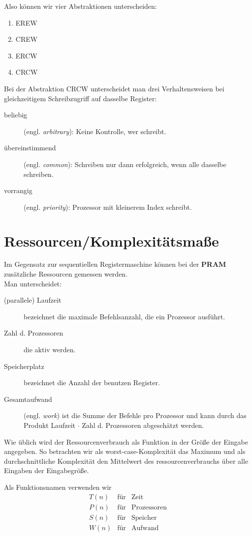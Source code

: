 Also können wir vier Abstraktionen unterscheiden:

\begin{enumerate}
\item EREW
\item CREW
\item ERCW
\item CRCW
\end{enumerate}

Bei der Abstraktion CRCW unterscheidet man drei Verhaltensweisen bei gleichzeitigem Schreibzugriff auf dasselbe Register:

\begin{description}
\item[beliebig] (engl. \emph{arbitrary}): Keine Kontrolle, wer schreibt.
\item[übereinstimmend] (engl. \emph{common}): Schreiben nur dann erfolgreich, wenn alle dasselbe schreiben.
\item[vorrangig] (engl. \emph{priority}): Prozessor mit kleinerem Index schreibt.
\end{description}


\section{Ressourcen/Komplexitätsmaße}
Im Gegensatz zur sequentiellen Registermaschine können bei der \textbf{PRAM} zusätzliche Ressourcen gemessen werden.\\
Man unterscheidet:

\begin{description}
\item[(parallele) Laufzeit] bezeichnet die maximale Befehlsanzahl, die ein Prozessor ausführt.
\item[Zahl d. Prozessoren] die aktiv werden.
\item[Speicherplatz] bezeichnet die Anzahl der benutzen Register.
\item[Gesamtaufwand] (engl. \emph{work}) ist die Summe der Befehle pro Prozessor und kann durch das Produkt Laufzeit $\cdot$ Zahl d. Prozessoren abgeschätzt werden. 
\end{description}

\noindent Wie üblich wird der Ressourcenverbrauch als Funktion in der Größe der Eingabe angegeben. So betrachten wir als worst-case-Komplexität das Maximum und als durchschnittliche Komplexität den Mittelwert des ressourcenverbrauchs über alle Eingaben der Eingabegröße.

\noindent Als Funktionsnamen verwenden wir
\begin{eqnarray*}
T(n) & \text{für} & \text{Zeit} \\
P(n) & \text{für} & \text{Prozessoren} \\
S(n) & \text{für} & \text{Speicher} \\
W(n) & \text{für} & \text{Aufwand} 
\end{eqnarray*}

